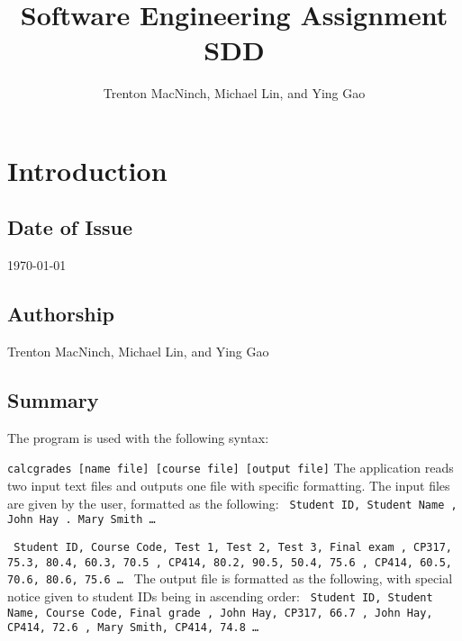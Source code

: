 \documentclass{article}
\title{\textbf{Software Engineering Assignment SDD}}
\author{Trenton MacNinch, Michael Lin, and Ying Gao}
\begin{document}
\maketitle
\newpage

\tableofcontents
\newpage

\section{Introduction}
\subsection{Date of Issue}
\today
\subsection{Authorship}
Trenton MacNinch, Michael Lin, and Ying Gao
\subsection{Summary}
The program is used with the following syntax:

\texttt{calcgrades [name file] [course file] [output file]}
\newline \newline
The application reads two input text files and outputs one file with specific formatting.
The input files are given by the user, formatted as the following:
\texttt{  \newline
  Student ID, Student Name , John Hay . Mary Smith \newline
  \ldots
}

\texttt{  \newline
  Student ID, Course Code, Test 1, Test 2, Test 3, Final exam , CP317, 75.3, 80.4, 60.3, 70.5 , CP414, 80.2, 90.5, 50.4, 75.6 , CP414, 60.5, 70.6, 80.6, 75.6 \newline
  \ldots
}
\newline \newline
The output file is formatted as the following, with special notice given to student IDs being in ascending order:
\texttt{  \newline
  Student ID, Student Name, Course Code, Final grade , John Hay, CP317, 66.7 , John Hay, CP414, 72.6 , Mary Smith, CP414, 74.8 \newline
  \ldots
}
\end{document}
